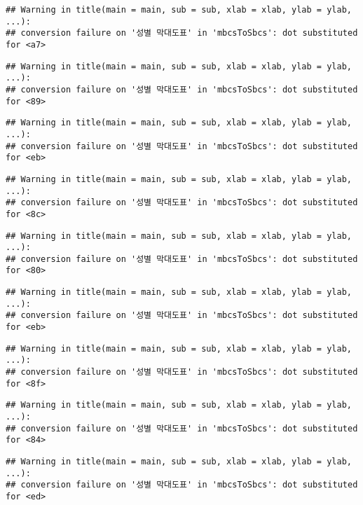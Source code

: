 \documentclass[
]{article}
\begin{document}
\begin{verbatim}
## Warning in title(main = main, sub = sub, xlab = xlab, ylab = ylab, ...):
## conversion failure on '성별 막대도표' in 'mbcsToSbcs': dot substituted for <a7>
\end{verbatim}

\begin{verbatim}
## Warning in title(main = main, sub = sub, xlab = xlab, ylab = ylab, ...):
## conversion failure on '성별 막대도표' in 'mbcsToSbcs': dot substituted for <89>
\end{verbatim}

\begin{verbatim}
## Warning in title(main = main, sub = sub, xlab = xlab, ylab = ylab, ...):
## conversion failure on '성별 막대도표' in 'mbcsToSbcs': dot substituted for <eb>
\end{verbatim}

\begin{verbatim}
## Warning in title(main = main, sub = sub, xlab = xlab, ylab = ylab, ...):
## conversion failure on '성별 막대도표' in 'mbcsToSbcs': dot substituted for <8c>
\end{verbatim}

\begin{verbatim}
## Warning in title(main = main, sub = sub, xlab = xlab, ylab = ylab, ...):
## conversion failure on '성별 막대도표' in 'mbcsToSbcs': dot substituted for <80>
\end{verbatim}

\begin{verbatim}
## Warning in title(main = main, sub = sub, xlab = xlab, ylab = ylab, ...):
## conversion failure on '성별 막대도표' in 'mbcsToSbcs': dot substituted for <eb>
\end{verbatim}

\begin{verbatim}
## Warning in title(main = main, sub = sub, xlab = xlab, ylab = ylab, ...):
## conversion failure on '성별 막대도표' in 'mbcsToSbcs': dot substituted for <8f>
\end{verbatim}

\begin{verbatim}
## Warning in title(main = main, sub = sub, xlab = xlab, ylab = ylab, ...):
## conversion failure on '성별 막대도표' in 'mbcsToSbcs': dot substituted for <84>
\end{verbatim}

\begin{verbatim}
## Warning in title(main = main, sub = sub, xlab = xlab, ylab = ylab, ...):
## conversion failure on '성별 막대도표' in 'mbcsToSbcs': dot substituted for <ed>
\end{verbatim}
\end{document}
